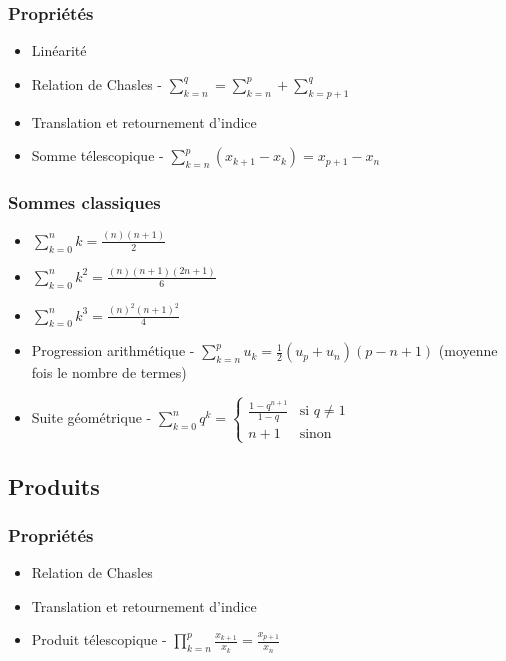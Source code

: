 \documentclass[openany]{book}
\begin{document}
\subsubsection{Propriétés}
\begin{itemize}
    \item Linéarité
    \item Relation de Chasles - $ \sum_{k=n}^{q} = \sum_{k=n}^{p} + \sum_{k=p+1}^{q} $
    \item Translation et retournement d'indice
    \item Somme télescopique - $ \sum_{k=n}^{p}(x_{k+1} - x_k) = x_{p+1} - x_n $
\end{itemize}

\subsubsection{Sommes classiques}
\begin{itemize}
    \item $ \sum_{k=0}^{n}k = \frac{(n)(n+1)}{2} $
    \item $ \sum_{k=0}^{n}k^2 = \frac{(n)(n+1)(2n+1)}{6} $
    \item $ \sum_{k=0}^{n}k^3 = \frac{(n)^2(n+1)^2}{4} $
    \item Progression arithmétique - $ \sum_{k=n}^{p}u_k = \frac{1}{2}(u_p+u_n)(p-n+1) $ (moyenne fois le nombre de termes)
    \item Suite géométrique -  $ \sum_{k=0}^n q^k = 
        \begin{cases}
            \frac{1-q^{n+1}}{1-q} & \text{si } q \neq 1 \\
            n+1 & \text{sinon}
        \end{cases}
    $
\end{itemize}

\subsection{Produits}
\subsubsection{Propriétés}
\begin{itemize}
    \item Relation de Chasles
    \item Translation et retournement d'indice
    \item Produit télescopique - $ \prod_{k=n}^p \frac{x_{k+1}}{x_k} = \frac{x_{p+1}}{x_n} $
\end{itemize}
\end{document}
